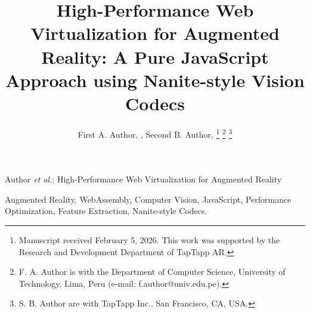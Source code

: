 \documentclass[journal]{IEEEtran}
\begin{document}
\title{High-Performance Web Virtualization for Augmented Reality: A Pure JavaScript Approach using Nanite-style Vision Codecs}

\author{First A. Author, , Second B. Author, 
\thanks{Manuscript received February 5, 2026. This work was supported by the Research and Development Department of TapTapp AR.}
\thanks{F. A. Author is with the Department of Computer Science, University of Technology, Lima, Peru (e-mail: f.author@univ.edu.pe).}
\thanks{S. B. Author are with TapTapp Inc., San Francisco, CA, USA.}}

%
{Author \MakeLowercase{\textit{et al.}}: High-Performance Web Virtualization for Augmented Reality}

\maketitle



\begin{IEEEkeywords}
Augmented Reality, WebAssembly, Computer Vision, JavaScript, Performance Optimization, Feature Extraction, Nanite-style Codecs.
\end{IEEEkeywords}









\end{document}
